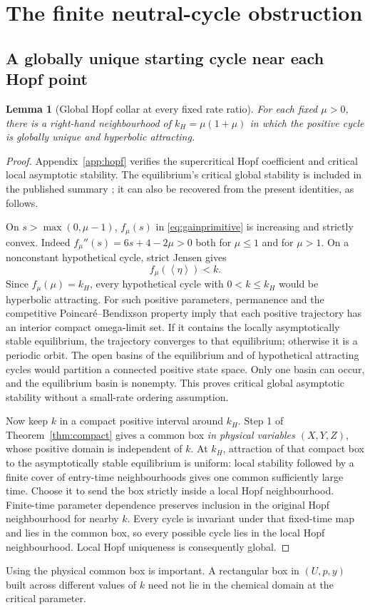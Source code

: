 \documentclass[11pt,a4paper]{article}
\numberwithin{equation}{section}
\newtheorem{lemma}[theorem]{Lemma}
\theoremstyle{remark}\newtheorem{remark}[theorem]{Remark}
\newcommand{\avg}[1]{\left\langle #1\right\rangle}
\begin{document}
\section{The finite neutral-cycle obstruction}\label{sec:obstruction}
\subsection{A globally unique starting cycle near each Hopf point}
\begin{lemma}[Global Hopf collar at every fixed rate ratio]\label{lem:collar}
For each fixed $\mu>0$, there is a right-hand neighbourhood of $k_H=\mu(1+\mu)$ in which the positive cycle is globally unique and hyperbolic attracting.
\end{lemma}
\begin{proof}
Appendix~\ref{app:hopf} verifies the supercritical Hopf coefficient and critical local asymptotic stability. The equilibrium's critical global stability is included in the published summary \cite[Theorem 13(v)]{BH23}; it can also be recovered from the present identities, as follows.

On $s>\max(0,\mu-1)$, $f_\mu(s)$ in \eqref{eq:gainprimitive} is increasing and strictly convex. Indeed $f_\mu''(s)=6s+4-2\mu>0$ both for $\mu\le1$ and for $\mu>1$. On a nonconstant hypothetical cycle, strict Jensen gives
\[
f_\mu(\avg\eta)<k.
\]
Since $f_\mu(\mu)=k_H$, every hypothetical cycle with $0<k\le k_H$ would be hyperbolic attracting. For such positive parameters, permanence and the competitive Poincar\'e--Bendixson property imply that each positive trajectory has an interior compact omega-limit set. If it contains the locally asymptotically stable equilibrium, the trajectory converges to that equilibrium; otherwise it is a periodic orbit. The open basins of the equilibrium and of hypothetical attracting cycles would partition a connected positive state space. Only one basin can occur, and the equilibrium basin is nonempty. This proves critical global asymptotic stability without a small-rate ordering assumption.

Now keep $k$ in a compact positive interval around $k_H$. Step 1 of Theorem~\ref{thm:compact} gives a common box \emph{in physical variables $(X,Y,Z)$}, whose positive domain is independent of $k$. At $k_H$, attraction of that compact box to the asymptotically stable equilibrium is uniform: local stability followed by a finite cover of entry-time neighbourhoods gives one common sufficiently large time. Choose it to send the box strictly inside a local Hopf neighbourhood. Finite-time parameter dependence preserves inclusion in the original Hopf neighbourhood for nearby $k$. Every cycle is invariant under that fixed-time map and lies in the common box, so every possible cycle lies in the local Hopf neighbourhood. Local Hopf uniqueness is consequently global.
\end{proof}
Using the physical common box is important. A rectangular box in $(U,p,y)$ built across different values of $k$ need not lie in the chemical domain at the critical parameter.
\end{document}

